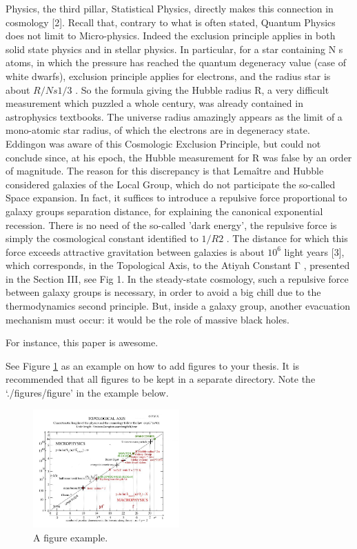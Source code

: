 Physics, the third pillar, Statistical Physics, directly makes this connection in cosmology [2].
Recall that, contrary to what is often stated, Quantum Physics does not limit to Micro-physics.
Indeed the exclusion principle applies in both solid state physics and in stellar physics. In particular,
for a star containing N s atoms, in which the pressure has reached the quantum degeneracy value
(case of white dwarfs), exclusion principle applies for electrons, and the radius star is about $R/N s1/3$ .
So the formula giving the Hubble radius R, a very difficult measurement which puzzled a whole
century, was already contained in astrophysics textbooks. The universe radius amazingly appears as
the limit of a mono-atomic star radius, of which the electrons are in degeneracy state. Eddingon was
aware of this Cosmologic Exclusion Principle, but could not conclude since, at his epoch, the
Hubble measurement for R was false by an order of magnitude.
The reason for this discrepancy is that Lemaître and Hubble considered galaxies of the Local
Group, which do not participate the so-called Space expansion. In fact, it suffices to introduce a
repulsive force proportional to galaxy groups separation distance, for explaining the canonical
exponential recession. There is no need of the so-called 'dark energy', the repulsive force is simply
the cosmological constant identified to $1/R 2$ . The distance for which this force exceeds attractive
gravitation between galaxies is about $10^6$ light years [3], which corresponds, in the Topological
Axis, to the Atiyah Constant Γ , presented in the Section III, see Fig 1.
In the steady-state cosmology, such a repulsive force between galaxy groups is necessary, in
order to avoid a big chill due to the thermodynamics second principle. But, inside a galaxy group,
another evacuation mechanism must occur: it would be the role of massive black holes.

For instance, this paper \cite{fm1} is awesome.

See Figure \ref{fig:figure_label} as an example on how to add figures to your thesis.
It is recommended that all figures to be kept in a separate directory.
Note the `./figures/figure' in the example below.


\begin{figure}
\centering
\includegraphics[width=0.5\textwidth]{./figures/figure}
\caption{A figure example.}
\label{fig:figure_label}
\end{figure}


